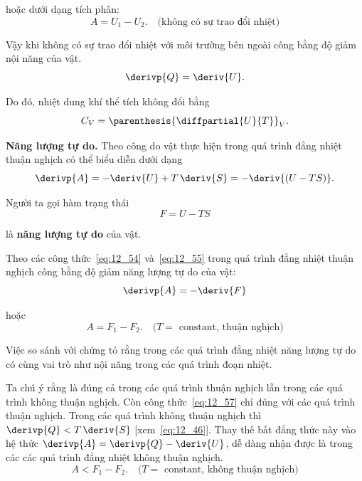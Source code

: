 \noindent
hoặc dưới dạng tích phân:
\begin{equation}\label{eq:12_51}
	A = U_1 - U_2. \quad \text{(không có sự trao đổi nhiệt)}
\end{equation}

\noindent
Vậy khi không có sự trao đổi nhiệt với môi trường bên ngoài công bằng độ giảm nội năng của vật.
\begin{equation}\label{eq:12_52}
	\derivp{Q} = \deriv{U}.
\end{equation}

\noindent
Do đó, nhiệt dung khí thể tích không đổi bằng
\begin{equation}\label{eq:12_53}
	C_V = \parenthesis{\diffpartial{U}{T}}_V.
\end{equation}

\textbf{Năng lượng tự do.} Theo  công do vật thực hiện trong quá trình đẳng nhiệt thuận nghịch có thể biểu diễn dưới dạng
\begin{equation}\label{eq:12_54}
	\derivp{A} = - \deriv{U} + T\,\deriv{S} = -\deriv{(U - TS)}.
\end{equation}

\noindent
Người ta gọi hàm trạng thái
\begin{equation}\label{eq:12_55}
	F = U - TS
\end{equation}

\noindent
là \textbf{năng lượng tự do} của vật.

Theo các công thức~\eqref{eq:12_54} và~\eqref{eq:12_55} trong quá trình đẳng nhiệt thuận nghịch công bằng độ giảm năng lượng tự do của vật:
\begin{equation}\label{eq:12_56}
	\derivp{A} = -\deriv{F}
\end{equation}

\noindent
hoặc
\begin{equation}\label{eq:12_57}
	A = F_1 - F_2.\quad \text{($T = $ constant, thuận nghịch)}
\end{equation}

\noindent
Việc so sánh với  chứng tỏ rằng trong các quá trình đẳng nhiệt năng lượng tự do có cùng vai trò như nội năng trong các quá trình đoạn nhiệt.

Ta chú ý rằng  là đúng cả trong các quá trình thuận nghịch lẫn trong các quá trình không thuận nghịch. Còn công thức~\eqref{eq:12_57} chỉ đúng với các quá trình thuận nghịch. Trong các quá trình không thuận nghịch thì $\derivp{Q}<T\,\deriv{S}$ [xem~\eqref{eq:12_46}]. Thay thế bất đẳng thức này vào hệ thức $\derivp{A}=\derivp{Q}-\deriv{U}$, dễ dàng nhận được là trong các các quá trình đẳng nhiệt không thuận nghịch.
\begin{equation}\label{eq:12_58}
	A < F_1 - F_2.\quad \text{($T = $ constant, không thuận nghịch)}
\end{equation}

